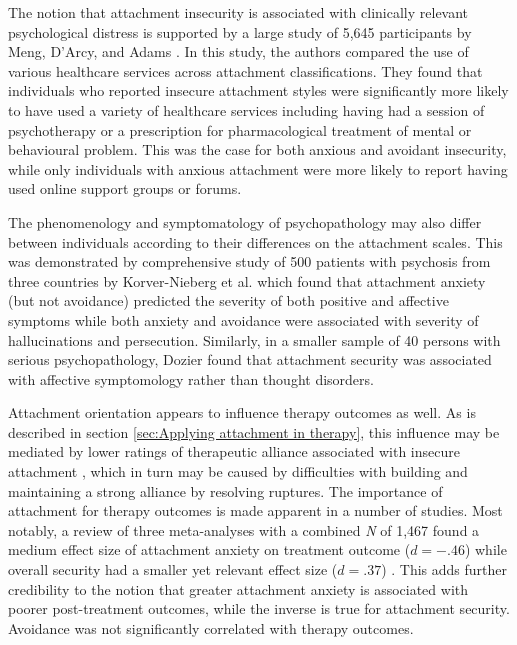 \documentclass[12pt]{report}
\begin{document}
The notion that attachment insecurity is associated with clinically relevant psychological distress is supported by a large study of 5,645 participants by Meng, D'Arcy, and Adams \cite{Meng2015}.
In this study, the authors compared the use of various healthcare services across attachment classifications. They found that individuals who reported insecure attachment styles were significantly more likely to have used a variety of healthcare services including having had a session of psychotherapy or a prescription for pharmacological treatment of mental or behavioural problem. This was the case for both anxious and avoidant insecurity, while only individuals with anxious attachment were more likely to report having used online support groups or forums.

The phenomenology and symptomatology of psychopathology may also differ between individuals according to their differences on the attachment scales.
This was demonstrated by comprehensive study of 500 patients with psychosis from three countries by Korver-Nieberg et al. \cite{Korver-Nieberg2015} which found that attachment anxiety (but not avoidance) predicted the severity of both positive and affective symptoms while both anxiety and avoidance were associated with severity of hallucinations and persecution.
Similarly, in a smaller sample of 40 persons with serious psychopathology, Dozier \cite{Dozier1990} found that attachment security was associated with affective symptomology rather than thought disorders.

Attachment orientation appears to influence therapy outcomes as well. As is described in section \ref{sec:Applying attachment in therapy}, this influence may be mediated by lower ratings of therapeutic alliance associated with insecure attachment \cite{Baier2020}, which in turn may be caused by difficulties with building and maintaining a strong alliance by resolving ruptures.
The importance of attachment for therapy outcomes is made apparent in a number of studies. Most notably, a review of three meta-analyses with a combined \textit{N} of 1,467 found a medium effect size of attachment anxiety on treatment outcome ($d=-.46$) while overall security had a smaller yet relevant effect size ($d=.37$) \cite{Levy2011}. This adds further credibility to the notion that greater attachment anxiety is associated with poorer post-treatment outcomes, while the inverse is true for attachment security. Avoidance was not significantly correlated with therapy outcomes.
\end{document}
